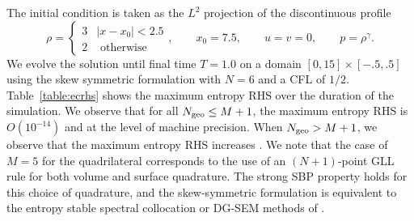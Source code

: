 \documentclass{svjour3}                     %
\begin{document}
The initial condition is taken as the $L^2$ projection of the discontinuous profile
\[
    \rho = \begin{cases}
    3 & |x-x_0| < 2.5\\
    2 & \text{ otherwise}
    \end{cases}, \qquad 
    x_0 = 7.5, \qquad u = v = 0, \qquad p = \rho^\gamma.
\]
We evolve the solution until final time $T = 1.0$ on a domain $[0,15]\times[-.5,.5]$ using the skew symmetric formulation with $N = 6$ and a CFL of $1/2$.  Table~\ref{table:ecrhs} shows the maximum entropy RHS over the duration of the simulation. We observe that for all $N_{\rm geo} \leq M+1$, the maximum entropy RHS is $O(10^{-14})$ and at the level of machine precision.  When $N_{\rm geo}> M+1$, we observe that the maximum entropy RHS increases .  We note that the case of $M= 5$ for the quadrilateral corresponds to the use of an $(N+1)$-point GLL rule for both volume and surface quadrature.  The strong SBP property holds for this choice of quadrature, and the skew-symmetric formulation is equivalent to the entropy stable spectral collocation or DG-SEM  methods of \cite{carpenter2014entropy, gassner2016split}.  

\begin{table}
\centering
{}\\
\caption{Maximum absolute value of the entropy RHS for degree $N=6$ over $t\in [0,1]$ on triangular and quadrilateral meshes.  The volume quadrature for the quadrilateral mesh is taken to be $(N+1)$-point GLL quadrature.  The surface quadrature is taken to be a 1D GLL quadrature with a varying number of points, such that the rule is exact for degree $M+N$ polynomials.  }
\label{table:ecrhs}
\end{table}
\end{document}
